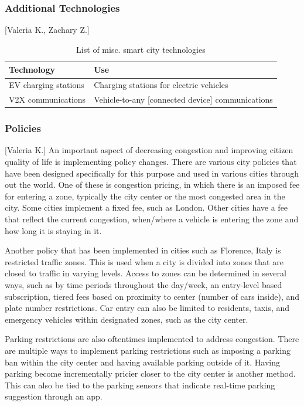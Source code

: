 \documentclass[12pt]{article}                               %
\begin{document}
\subsubsection{Additional Technologies}[Valeria K., Zachary Z.]
\begin{table}[H]
    \centering
    \small
    \begin{tabular}{l|l}
        \textbf{Technology} & \textbf{Use} \\
        \hline{}
        
        EV charging stations &
        Charging stations for electric vehicles \\
        \hline{}
        
        V2X communications &
        Vehicle-to-any [connected device] communications
    \end{tabular}
    \caption{List of misc. smart city technologies}
    \label{tab:additional_tech}
\end{table}

\subsubsection{Policies}[Valeria K.] \label{sec:policies}
An important aspect of decreasing congestion and improving citizen quality of life is implementing policy changes. There are various city policies that have been designed specifically for this purpose and used in various cities through out the world. One of these is congestion pricing, in which there is an imposed fee for entering a zone, typically the city center or the most congested area in the city. Some cities implement a fixed fee, such as London. Other cities have a fee that reflect the current congestion, when/where a vehicle is entering the zone and how long it is staying in it.

Another policy that has been implemented in cities such as Florence, Italy is restricted traffic zones. This is used when a city is divided into zones that are closed to traffic in varying levels. Access to zones can be determined in several ways, such as by time periods throughout the day/week, an entry-level based subscription, tiered fees based on proximity to center (number of cars inside), and plate number restrictions. Car entry can also be limited to residents, taxis, and emergency vehicles within designated zones, such as the city center. 

Parking restrictions are also oftentimes implemented to address congestion. There are multiple ways to implement parking restrictions such as imposing a parking ban within the city center and having available parking outside of it. Having parking become incrementally pricier closer to the city center is another method. This can also be tied to the parking sensors that indicate real-time parking suggestion through an app.
\end{document}
